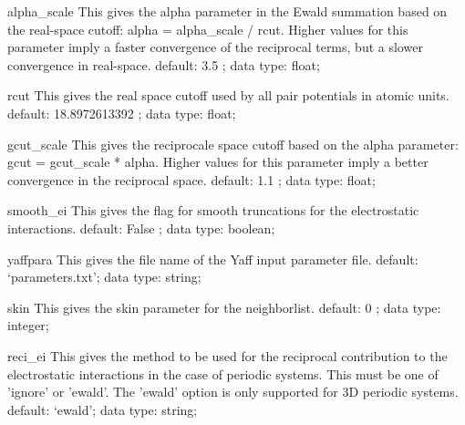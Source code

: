 \begin{ipifield}{}
\begin{ipifield}{alpha\_scale}
{This gives the alpha parameter in the Ewald summation based on the real-space cutoff: alpha = alpha\_scale / rcut. Higher values for this parameter imply a faster convergence of the reciprocal terms, but a slower convergence in real-space.}%
{default:  3.5 ; data type: float; }%
{}
\end{ipifield}
\begin{ipifield}{rcut}%
{This gives the real space cutoff used by all pair potentials in atomic units.}%
{default:  18.8972613392 ; data type: float; }%
{}
\end{ipifield}
\begin{ipifield}{gcut\_scale}%
{This gives the reciprocale space cutoff based on the alpha parameter: gcut = gcut\_scale * alpha. Higher values for this parameter imply a better convergence in the reciprocal space.}%
{default:  1.1 ; data type: float; }%
{}
\end{ipifield}
\begin{ipifield}{smooth\_ei}%
{This gives the flag for smooth truncations for the electrostatic interactions.}%
{default:  False ; data type: boolean; }%
{}
\end{ipifield}
\begin{ipifield}{yaffpara}%
{This gives the file name of the Yaff input parameter file.}%
{default: `parameters.txt'; data type: string; }%
{}
\end{ipifield}
\begin{ipifield}{skin}%
{This gives the skin parameter for the neighborlist.}%
{default:  0 ; data type: integer; }%
{}
\end{ipifield}
\begin{ipifield}{reci\_ei}%
{This gives the method to be used for the reciprocal contribution to the electrostatic interactions in the case of periodic systems. This must be one of 'ignore' or 'ewald'. The 'ewald' option is only supported for 3D periodic systems.}%
{default: `ewald'; data type: string; }%
{}
\end{ipifield}
\end{ipifield}
